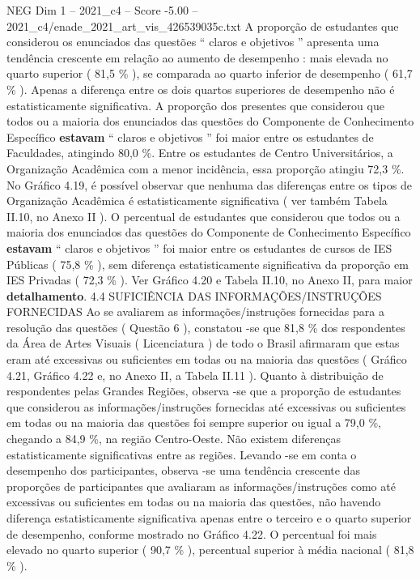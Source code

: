 \begin{textsample}{NEG Dim 1 – 2021\_c4 – Score -5.00 – 2021\_c4/enade\_2021\_art\_vis\_426539035c.txt}
A proporção de estudantes que considerou os enunciados das questões “ claros e objetivos ” apresenta uma tendência crescente em relação ao aumento de desempenho : mais elevada no quarto superior ( 81,5 \% ), se comparada ao quarto inferior de desempenho ( 61,7 \% ).
Apenas a diferença entre os dois quartos superiores de desempenho não é estatisticamente significativa.
A proporção dos presentes que considerou que todos ou a maioria dos enunciados das questões do Componente de Conhecimento Específico \textbf{estavam} “ claros e objetivos ” foi maior entre os estudantes de Faculdades, atingindo 80,0 \%.
Entre os estudantes de Centro Universitários, a Organização Acadêmica com a menor incidência, essa proporção atingiu 72,3 \%.
No Gráfico 4.19, é possível observar que nenhuma das diferenças entre os tipos de Organização Acadêmica é estatisticamente significativa ( ver também Tabela II.10, no Anexo II ).
O percentual de estudantes que considerou que todos ou a maioria dos enunciados das questões do Componente de Conhecimento Específico \textbf{estavam} “ claros e objetivos ” foi maior entre os estudantes de cursos de IES Públicas ( 75,8 \% ), sem diferença estatisticamente significativa da proporção em IES Privadas ( 72,3 \% ).
Ver Gráfico 4.20 e Tabela II.10, no Anexo II, para maior \textbf{detalhamento}. 4.4 SUFICIÊNCIA DAS INFORMAÇÕES/INSTRUÇÕES FORNECIDAS Ao se avaliarem as informações/instruções fornecidas para a resolução das questões ( Questão 6 ), constatou -se que 81,8 \% dos respondentes da Área de Artes Visuais ( Licenciatura ) de todo o Brasil afirmaram que estas eram até excessivas ou suficientes em todas ou na maioria das questões ( Gráfico 4.21, Gráfico 4.22 e, no Anexo II, a Tabela II.11 ).
Quanto à distribuição de respondentes pelas Grandes Regiões, observa -se que a proporção de estudantes que considerou as informações/instruções fornecidas até excessivas ou suficientes em todas ou na maioria das questões foi sempre superior ou igual a 79,0 \%, chegando a 84,9 \%, na região Centro-Oeste.
Não existem diferenças estatisticamente significativas entre as regiões.
Levando -se em conta o desempenho dos participantes, observa -se uma tendência crescente das proporções de participantes que avaliaram as informações/instruções como até excessivas ou suficientes em todas ou na maioria das questões, não havendo diferença estatisticamente significativa apenas entre o terceiro e o quarto superior de desempenho, conforme mostrado no Gráfico 4.22.
O percentual foi mais elevado no quarto superior ( 90,7 \% ), percentual superior à média nacional ( 81,8 \% ).

\end{textsample}
